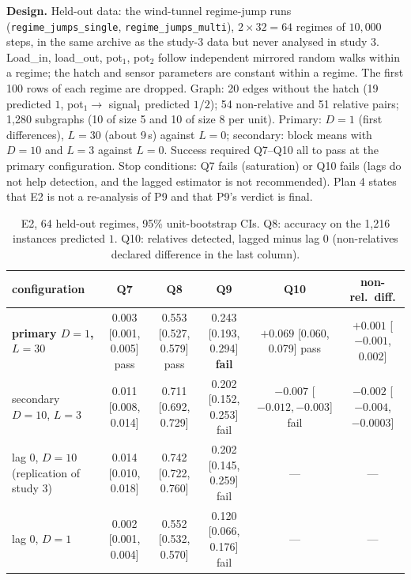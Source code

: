 \textbf{Design.} Held-out data: the wind-tunnel regime-jump runs (\texttt{regime\_\allowbreak jumps\_\allowbreak single}, \texttt{regime\_\allowbreak jumps\_\allowbreak multi}), $2\times32=64$ regimes of $10{,}000$ steps, in the same archive as the study-3 data but never analysed in study 3.
Load\_\allowbreak in, load\_\allowbreak out, pot$_1$, pot$_2$ follow independent mirrored random walks within a regime; the hatch and sensor parameters are constant within a regime. The first 100 rows of each regime are dropped. Graph: 20 edges without the hatch (19 predicted $1$, pot$_1\to$ signal$_1$ predicted $1/2$); 54 non-relative and 51 relative pairs; 1{,}280 subgraphs (10 of size 5 and 10 of size 8 per unit). Primary: $D=1$ (first differences), $L=30$ (about 9\,s) against $L=0$; secondary: block means with $D=10$ and $L=3$ against $L=0$.
Success required Q7--Q10 all to pass at the primary configuration. Stop conditions: Q7 fails (saturation) or Q10 fails (lags do not help detection, and the lagged estimator is not recommended). Plan 4 states that E2 is not a re-analysis of P9 and that P9's verdict is final.

\begin{table}
\caption{E2, 64 held-out regimes, 95\% unit-bootstrap CIs. Q8: accuracy on the 1{,}216 instances predicted $1$. Q10: relatives detected, lagged minus lag 0 (non-relatives declared difference in the last column).}
\label{tab:e2}
\centering\tiny
\setlength{\tabcolsep}{3pt}
\begin{tabular}{lccccc}
\toprule
configuration & Q7 & Q8 & Q9 & Q10 & non-rel.\ diff. \\
\midrule
\textbf{primary $D{=}1$, $L{=}30$} & 0.003 [0.001, 0.005] pass & 0.553 [0.527, 0.579] pass & 0.243 [0.193, 0.294] \textbf{fail} & $+0.069$ [0.060, 0.079] pass & $+0.001$ [$-0.001$, 0.002] \\
secondary $D{=}10$, $L{=}3$ & 0.011 [0.008, 0.014] & 0.711 [0.692, 0.729] & 0.202 [0.152, 0.253] fail & $-0.007$ [$-0.012,-0.003$] fail & $-0.002$ [$-0.004$, $-0.0003$] \\
lag 0, $D{=}10$ (replication of study 3) & 0.014 [0.010, 0.018] & 0.742 [0.722, 0.760] & 0.202 [0.145, 0.259] fail & --- & --- \\
lag 0, $D{=}1$ & 0.002 [0.001, 0.004] & 0.552 [0.532, 0.570] & 0.120 [0.066, 0.176] fail & --- & --- \\
\bottomrule
\end{tabular}
\end{table}

